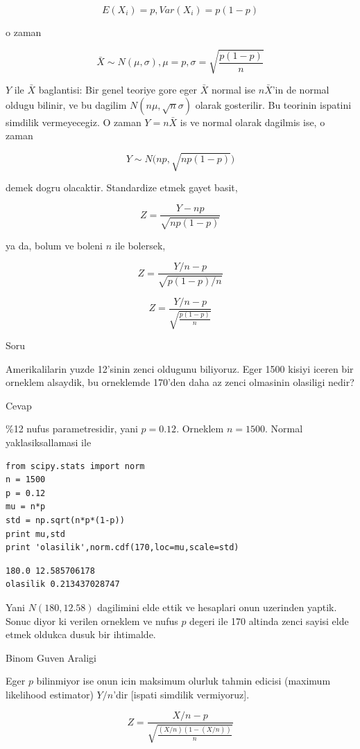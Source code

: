 \documentclass[12pt,fleqn]{article}\usepackage{../common}
\begin{document}
$$E(X_i) = p, Var(X_i) = p(1-p)$$

o zaman 

$$\bar{X} \sim N(\mu,\sigma), \mu = p, \sigma = \sqrt{\frac{p(1-p)}{n}}$$

$Y$ ile $\bar{X}$ baglantisi: Bir genel teoriye gore eger $\bar{X}$ normal
ise $n\bar{X}$'in de normal oldugu bilinir, ve bu dagilim
$N(n\mu,\sqrt{n}\sigma)$ olarak gosterilir. Bu teorinin ispatini simdilik
vermeyecegiz. O zaman $Y = n\bar{X}$ is ve normal olarak dagilmis ise, o zaman 

$$ Y \sim N\bigg(np, \sqrt{np(1-p)}\bigg)$$

demek dogru olacaktir. Standardize etmek gayet basit,


$$Z  = \frac{Y - np}{\sqrt{np(1-p)}}$$

ya da, bolum ve boleni $n$ ile bolersek,

$$Z  = \frac{Y/n - p}{\sqrt{p(1-p)/n}}$$


$$Z  = \frac{Y/n - p}{\sqrt{\frac{p(1-p)}{n}}}$$

Soru

Amerikalilarin yuzde 12'sinin zenci oldugunu biliyoruz. Eger 1500 kisiyi
iceren bir orneklem alsaydik, bu orneklemde 170'den daha az zenci
olmasinin olasiligi nedir? 

Cevap

\%12 nufus parametresidir, yani $p=0.12$. Orneklem $n=1500$. Normal
yaklasiksallamasi ile 

\begin{verbatim}
from scipy.stats import norm
n = 1500
p = 0.12
mu = n*p
std = np.sqrt(n*p*(1-p))
print mu,std
print 'olasilik',norm.cdf(170,loc=mu,scale=std)
\end{verbatim}

\begin{verbatim}
180.0 12.585706178
olasilik 0.213437028747
\end{verbatim}

Yani $N(180,12.58)$ dagilimini elde ettik ve hesaplari onun uzerinden
yaptik. Sonuc diyor ki verilen orneklem ve nufus $p$ degeri ile 170 altinda
zenci sayisi elde etmek oldukca dusuk bir ihtimalde. 

Binom Guven Araligi

Eger $p$ bilinmiyor ise onun icin maksimum olurluk tahmin edicisi (maximum
likelihood estimator) $Y/n$'dir [ispati simdilik vermiyoruz]. 

$$Z  = \frac{X/n - p}{\sqrt{\frac{(X/n)(1-(X/n))}{n}}}$$
\end{document}
